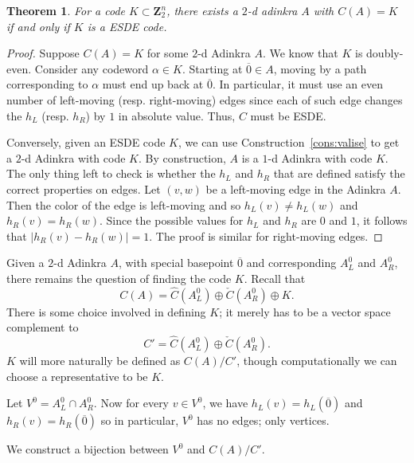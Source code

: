 \documentclass[12pt,twoside,singlespace]{article}
\numberwithin{equation}{section}
\newtheorem{thm}[equation]{Theorem}
\theoremstyle{definition}
\newcommand{\ZZ}{\mathbf{Z}}
\begin{document}
\begin{thm}
\label{thm:esde}
For a code $K \subset \ZZ_2^n$, there exists a $2$-d adinkra $A$ with $C(A) = K$ if and only if $K$ is a ESDE code.
\end{thm}
\begin{proof}
Suppose $C(A) = K$ for some $2$-d Adinkra $A$. We know that $K$ is doubly-even. Consider any codeword $\alpha \in K$. Starting at $\overline{0} \in A$, moving by a path corresponding to $\alpha$ must end up back at $\overline{0}$. In particular, it must use an even number of left-moving (resp. right-moving) edges since each of such edge changes the $h_L$ (resp. $h_R$) by $1$ in absolute value. Thus, $C$ must be ESDE. 

Conversely, given an ESDE code $K$, we can use Construction~\ref{cons:valise} to get a $2$-d Adinkra with code $K$. By construction, $A$ is a $1$-d Adinkra with code $K$.  The only thing left to check is whether the $h_L$ and $h_R$ that are defined satisfy the correct properties on edges. Let $(v,w)$ be a left-moving edge in the Adinkra $A$.  Then the color of the edge is left-moving and so $h_L(v)\not=h_L(w)$ and $h_R(v)=h_R(w)$.  Since the possible values for $h_L$ and $h_R$ are $0$ and $1$, it follows that $|h_R(v)-h_R(w)|=1$. The proof is similar for right-moving edges.

\end{proof}

Given a $2$-d Adinkra $A$, with special basepoint $\overline{0}$ and corresponding $A_L^0$ and $A_R^0$, there remains the question of finding the code $K$.  Recall that
\[C(A)=\hat{C}(A_L^0)\oplus\check{C}(A_R^0)\oplus K.\]
There is some choice involved in defining $K$; it merely has to be a vector space complement to
\[C'=\hat{C}(A_L^0)\oplus\check{C}(A_R^0).\]
$K$ will more naturally be defined as $C(A)/C'$, though computationally we can choose a representative to be $K$.


Let $V^0=A_L^0\cap A_R^0$.  Now for every $v\in V^0$, we have $h_L(v)=h_L(\overline{0})$ and $h_R(v)=h_R(\overline{0})$ so in particular, $V^0$ has no edges; only vertices.

We construct a bijection between $V^0$ and $C(A)/C'$.
\end{document}
